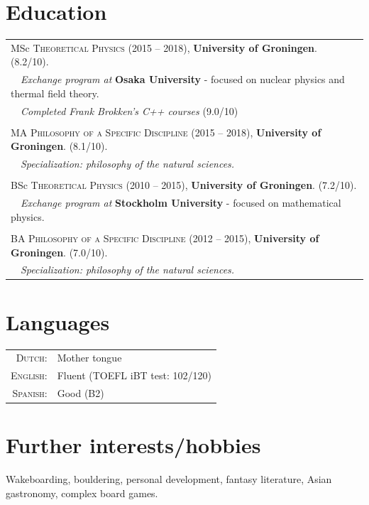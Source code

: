 \documentclass[a4paper,8pt]{article}
\begin{document}
\section{Education}
\begin{tabular}{l}
MSc \textsc{Theoretical Physics} (2015 -- 2018), \textbf{University of Groningen}. (8.2/10).\\
\ \ \textit{Exchange program at} \textbf{Osaka University} - focused on nuclear physics and thermal field theory. \\
\ \ \textit{Completed Frank Brokken's C++ courses} (9.0/10)
\\ \\
 MA \textsc{Philosophy of a Specific Discipline} (2015 -- 2018),
\textbf{University of Groningen}. (8.1/10). \\ 
\ \ \textit{Specialization: philosophy of the natural sciences.}
\\ \\
 BSc \textsc{Theoretical Physics} (2010 --  2015), \textbf{University of Groningen}. (7.2/10).\\ 
\ \ \textit{Exchange program at} \textbf{Stockholm University} - focused on mathematical physics. \\
 \\
 BA \textsc{Philosophy of a Specific Discipline} (2012 --  2015), \textbf{University of Groningen}. (7.0/10). \\
\ \  \textit{Specialization: philosophy of the natural sciences.}
\end{tabular}

\section{Languages}
\begin{tabular}{rl}
 \textsc{Dutch:}&Mother tongue\\
\textsc{English:}&Fluent (TOEFL iBT test: 102/120)\\
\textsc{Spanish:}&Good (B2)\\
\end{tabular}


\section{Further interests/hobbies}
Wakeboarding, bouldering, personal development, fantasy literature, Asian gastronomy, complex board games.
\end{document}
